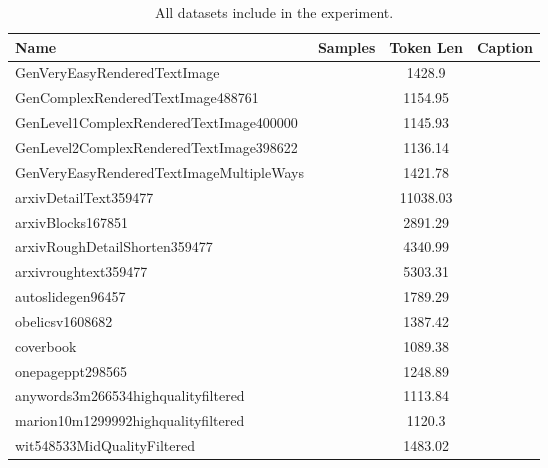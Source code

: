 \begin{table*}[h]
    \centering
    \begin{tabular}{l|ccc}
    \hline
        Name & Samples & Token Len  & Caption \\
        \hline
    GenVeryEasyRenderedTextImage & &1428.9 &  \\ 
GenComplexRenderedTextImage488761 && 1154.95\\    GenLevel1ComplexRenderedTextImage400000 &&1145.93 \\
GenLevel2ComplexRenderedTextImage398622 && 1136.14 \\    GenVeryEasyRenderedTextImageMultipleWays && 1421.78 \\
    arxivDetailText359477 & &11038.03\\
    arxivBlocks167851 &&2891.29\\
arxivRoughDetailShorten359477&&4340.99\\
    arxivroughtext359477&& 5303.31 \\
    autoslidegen96457 && 1789.29 \\
    obelicsv1608682 && 1387.42 \\
    coverbook && 1089.38 \\
    onepageppt298565&& 1248.89\\
anywords3m266534highqualityfiltered&&  1113.84 \\    marion10m1299992highqualityfiltered && 1120.3 \\
wit548533MidQualityFiltered && 1483.02 \\
    \hline
    \end{tabular}
    \caption{All datasets include in the experiment.}
    \label{tab:mylabel}
\end{table*}